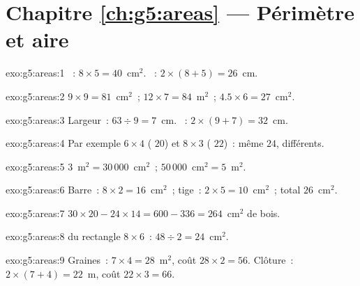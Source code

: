 \section*{Chapitre \ref{ch:g5:areas} --- Périmètre et aire}

\begin{solution}{exo:g5:areas:1}
~: $8 \times 5 = 40$~cm$^2$. ~:
$2 \times (8 + 5) = 26$~cm.
\end{solution}

\begin{solution}{exo:g5:areas:2}
$9 \times 9 = 81$~cm$^2$~; \quad $12 \times 7 = 84$~m$^2$~; \quad
$4.5 \times 6 = 27$~cm$^2$.
\end{solution}

\begin{solution}{exo:g5:areas:3}
Largeur~: $63 \div 9 = 7$~cm. ~: $2 \times (9 + 7) = 32$~cm.
\end{solution}

\begin{solution}{exo:g5:areas:4}
Par exemple $6 \times 4$ ( $20$) et $8 \times 3$
( $22$)~: même  $24$,  différents.
\end{solution}

\begin{solution}{exo:g5:areas:5}
$3$~m$^2 = 30\,000$~cm$^2$~; \quad $50\,000$~cm$^2 = 5$~m$^2$.
\end{solution}

\begin{solution}{exo:g5:areas:6}
Barre~: $8 \times 2 = 16$~cm$^2$~; tige~: $2 \times 5 = 10$~cm$^2$~;
total $26$~cm$^2$.
\end{solution}

\begin{solution}{exo:g5:areas:7}
$30 \times 20 - 24 \times 14 = 600 - 336 = 264$~cm$^2$ de bois.
\end{solution}

\begin{solution}{exo:g5:areas:8}
 du rectangle $8 \times 6$~: $48 \div 2 = 24$~cm$^2$.
\end{solution}

\begin{solution}{exo:g5:areas:9}
Graines~:  $7 \times 4 = 28$~m$^2$, coût $28 \times 2 = 56$.
Clôture~:  $2 \times (7 + 4) = 22$~m, coût
$22 \times 3 = 66$.
\end{solution}


